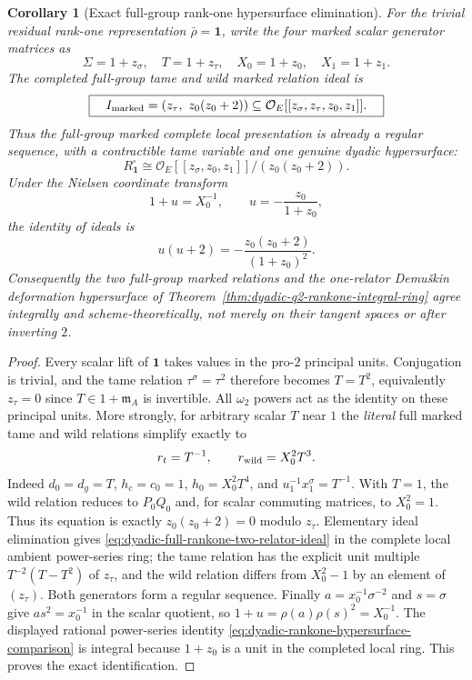 \documentclass[11pt]{article}
\newtheorem{corollary}[theorem]{Corollary}
\theoremstyle{definition}
\begin{document}
\begin{corollary}[Exact full-group rank-one hypersurface elimination]
\label{cor:dyadic-full-rankone-tame-elimination}
For the trivial residual rank-one
representation $\bar\rho=\mathbf1$,
write the four marked scalar generator
matrices as
\[
\Sigma=1+z_\sigma,\quad
T=1+z_\tau,\quad
X_0=1+z_0,\quad
X_1=1+z_1.
\]
The completed full-group tame and wild
marked relation ideal is
\begin{equation}\label{eq:dyadic-full-rankone-two-relator-ideal}
\boxed{\quad
I_{\rm marked}
=(z_\tau,\ z_0(z_0+2))
\subseteq
\mathcal O_E[[z_\sigma,z_\tau,z_0,z_1]].
\quad}
\end{equation}
Thus the full-group marked
complete local presentation is already
a regular sequence, with a contractible
tame variable and one genuine
dyadic hypersurface:
\[
R^\square_{\mathbf1}
\cong
\mathcal O_E[[z_\sigma,z_0,z_1]]/
(z_0(z_0+2)).
\]
Under the Nielsen coordinate transform
\begin{equation}\label{eq:dyadic-rankone-u-z0-change}
 1+u=X_0^{-1},\qquad
 u=-\frac{z_0}{1+z_0},
\end{equation}
the identity of ideals is
\begin{equation}\label{eq:dyadic-rankone-hypersurface-comparison}
u(u+2)=-\frac{z_0(z_0+2)}{(1+z_0)^2}.
\end{equation}
Consequently the two full-group marked
relations and the one-relator
Demu\v{s}kin deformation hypersurface
of Theorem~\ref{thm:dyadic-q2-rankone-integral-ring}
agree \emph{integrally and scheme-theoretically},
not merely on their tangent spaces
or after inverting $2$.
\end{corollary}

\begin{proof}
Every scalar lift of $\mathbf1$ takes
values in the pro-$2$ principal units.
Conjugation is trivial, and the tame
relation $\tau^\sigma=\tau^2$
therefore becomes $T=T^2$,
equivalently $z_\tau=0$ since
$T\in1+\mathfrak m_A$ is invertible.
All $\omega_2$ powers act as the identity
on these principal units.  More strongly,
for arbitrary scalar $T$ near $1$ the
\emph{literal} full marked tame and wild
relations simplify exactly to
\[
r_t=T^{-1},\qquad
r_{\rm wild}=X_0^2T^3.
\]
Indeed $d_0=d_g=T$, $h_c=c_0=1$,
$h_0=X_0^2T^4$, and
$u_1^{-1}x_1^\sigma=T^{-1}$.
With $T=1$, the wild relation
reduces to $P_0Q_0$ and, for scalar
commuting matrices, to $X_0^2=1$.
Thus its equation is exactly
$z_0(z_0+2)=0$ modulo $z_\tau$.
Elementary ideal elimination gives
\eqref{eq:dyadic-full-rankone-two-relator-ideal}
in the complete local ambient
power-series ring; the tame relation
has the explicit unit multiple
$T^{-2}(T-T^2)$ of $z_\tau$,
and the wild relation differs from
$X_0^2-1$ by an element of
$(z_\tau)$.  Both generators form
a regular sequence.
Finally
$a=x_0^{-1}\sigma^{-2}$ and $s=\sigma$
give $a s^2=x_0^{-1}$ in the
scalar quotient, so
$1+u=\rho(a)\rho(s)^2=X_0^{-1}$.
The displayed rational power-series
identity
\eqref{eq:dyadic-rankone-hypersurface-comparison}
is integral because $1+z_0$ is a
unit in the completed local ring.
This proves the exact identification.
\end{proof}
\end{document}

